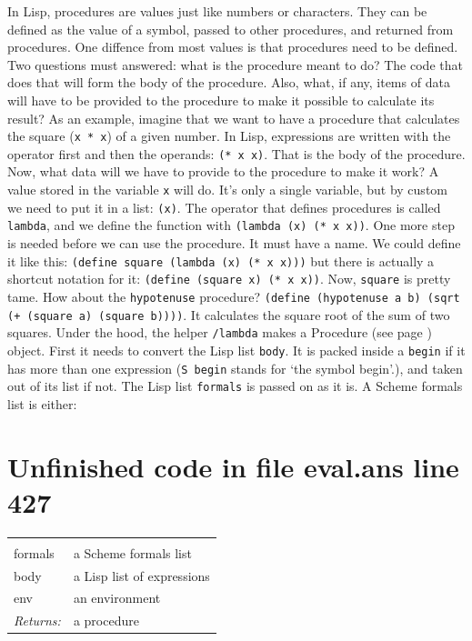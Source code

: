 \documentclass[twoside,9pt]{report}
\begin{document}
In Lisp, procedures are values just like numbers or characters. They can be defined as the value of a symbol, passed to other procedures, and returned from procedures. One diffence from most values is that procedures need to be defined. Two questions must answered: what is the procedure meant to do? The code that does that will form the body of the procedure. Also, what, if any, items of data will have to be provided to the procedure to make it possible to calculate its result? As an example, imagine that we want to have a procedure that calculates the square (\texttt{x * x}) of a given number. In Lisp, expressions are written with the operator first and then the operands: \texttt{(* x x)}. That is the body of the procedure. Now, what data will we have to provide to the procedure to make it work? A value stored in the variable \texttt{x} will do. It's only a single variable, but by custom we need to put it in a list: \texttt{(x)}. The operator that defines procedures is called \texttt{lambda}, and we define the function with \texttt{(lambda (x) (* x x))}. One more step is needed before we can use the procedure. It must have a name. We could define it like this: \texttt{(define square (lambda (x) (* x x)))} but there is actually a shortcut notation for it: \texttt{(define (square x) (* x x))}. Now, \texttt{square} is pretty tame. How about the \texttt{hypotenuse} procedure? \texttt{(define (hypotenuse a b) (sqrt (+ (square a) (square b))))}. It calculates the square root of the sum of two squares. Under the hood, the helper \texttt{/lambda} makes a Procedure (see page \pageref{control}) object. First it needs to convert the Lisp list \texttt{body}. It is packed inside a \texttt{begin} if it has more than one expression (\texttt{S begin} stands for `the symbol begin'.), and taken out of its list if not. The Lisp list \texttt{formals} is passed on as it is. A Scheme formals list is either:

\section{Unfinished code in file eval.ans line 427}
\noindent\begin{tabular}{ |p{1.9cm} p{8cm}| }
\hline
\rowcolor[HTML]{CCCCCC} \multicolumn{2}{|l|}{\bf /lambda (internal)} \\
formals & a Scheme formals list \\
body & a Lisp list of expressions \\
env & an environment \\
\textit{Returns:} & a procedure \\
\hline
\end{tabular}
\end{document}
